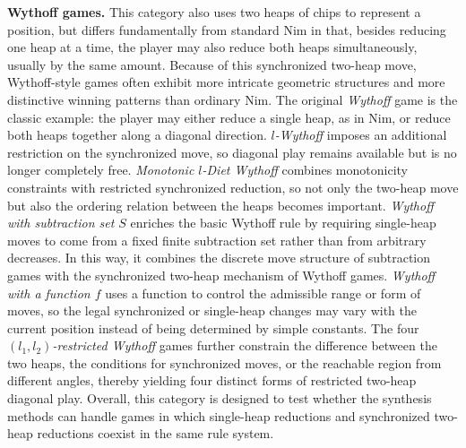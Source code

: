 \documentclass[review]{elsarticle}
\begin{document}
{\color{red}\textbf{Wythoff games.} This category also uses two heaps of chips to represent a position, but differs fundamentally from standard Nim in that, besides reducing one heap at a time, the player may also reduce both heaps simultaneously, usually by the same amount. 
Because of this synchronized two-heap move, Wythoff-style games often exhibit more intricate geometric structures and more distinctive winning patterns than ordinary Nim. The original \emph{Wythoff} game is the classic example: the player may either reduce a single heap, as in Nim, or reduce both heaps together along a diagonal direction. 
\emph{$l$-Wythoff} imposes an additional restriction on the synchronized move, so diagonal play remains available but is no longer completely free. 
\emph{Monotonic $l$-Diet Wythoff} combines monotonicity constraints with restricted synchronized reduction, so not only the two-heap move but also the ordering relation between the heaps becomes important. 
\emph{Wythoff with subtraction set $S$} enriches the basic Wythoff rule by requiring single-heap moves to come from a fixed finite subtraction set rather than from arbitrary decreases. 
In this way, it combines the discrete move structure of subtraction games with the synchronized two-heap mechanism of Wythoff games. 
\emph{Wythoff with a function $f$} uses a function to control the admissible range or form of moves, so the legal synchronized or single-heap changes may vary with the current position instead of being determined by simple constants. 
The four \emph{$(l_1,l_2)$-restricted Wythoff} games further constrain the difference between the two heaps, the conditions for synchronized moves, or the reachable region from different angles, thereby yielding four distinct forms of restricted two-heap diagonal play. 
Overall, this category is designed to test whether the synthesis methods can handle games in which single-heap reductions and synchronized two-heap reductions coexist in the same rule system.}
\end{document}
